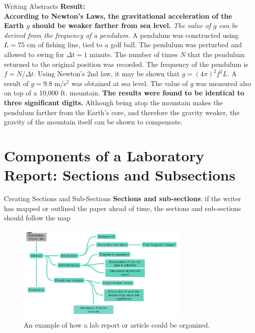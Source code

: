 \documentclass{beamer}
\begin{document}
\begin{frame}{Writing Abstracts}
\small
\textbf{Result:} \\
\textbf{\alert{According to Newton's Laws, the gravitational acceleration of the Earth $g$ should be weaker farther from sea level.}}  \textit{The value of $g$ can be derived from the frequency of a pendulum.}  A pendulum was constructed using $L = 75$ cm of fishing line, tied to a golf ball.  The pendulum was perturbed and allowed to swing for $\Delta t = 1$ minute.  The number of times $N$ that the pendulum returned to the original position was recorded.  The frequency of the pendulum is $f = N/\Delta t$.  Using Newton's 2nd law, it may be shown that $g = (4\pi)^2 f^2 L$.  \alert{A result of $g = 9.8$ m/s$^2$ was obtained at sea level.  The value of $g$ was measured also on top of a 10,000 ft. mountain.}  \textbf{\alert{The results were found to be identical to three significant digits.}} Although being atop the mountain makes the pendulum farther from the Earth's core, and therefore the gravity weaker, the gravity of the mountain itself can be shown to compensate.
\end{frame}

\section{Components of a Laboratory Report: Sections and Subsections}

\begin{frame}{Creating Sections and Sub-Sections}
\textbf{Sections and sub-sections}: if the writer has mapped or outlined the paper ahead of time, the sections and sub-sections should follow the map
\begin{figure}
\centering
\includegraphics[width=0.75\textwidth]{figures/map1.pdf}
\caption{\label{fig:maplab} An example of how a lab report or article could be organized.}
\end{figure}
\end{frame}
\end{document}
